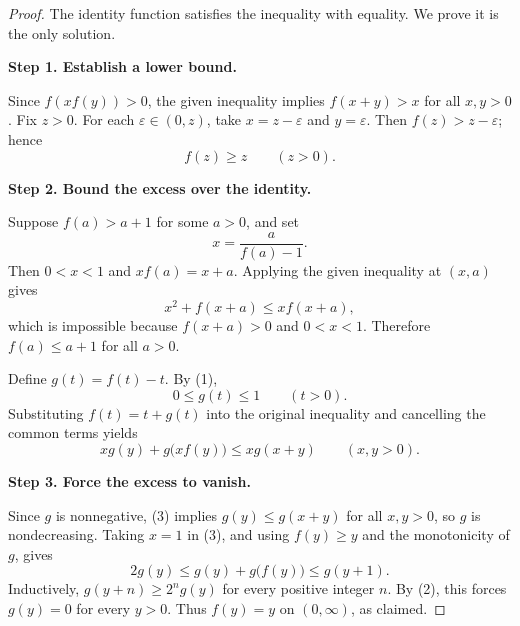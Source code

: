 
\begin{dlsummary}[title={\bfseries Solution 20. The Cross-Dilated Shift},breakable]

\begin{proof}
The identity function satisfies the inequality with equality. We prove it
is the only solution.

\medskip
\noindent
\textbf{Step 1. Establish a lower bound.}

Since $f(xf(y))>0$, the given inequality implies $f(x+y)>x$ for all
$x,y>0$. Fix $z>0$. For each $\varepsilon\in(0,z)$, take
$x=z-\varepsilon$ and $y=\varepsilon$. Then $f(z)>z-\varepsilon$;
hence
\[
f(z)\geq z\qquad(z>0). \tag{1}
\]

\medskip
\noindent
\textbf{Step 2. Bound the excess over the identity.}

Suppose $f(a)>a+1$ for some $a>0$, and set
\[
x=\frac{a}{f(a)-1}.
\]
Then $0<x<1$ and $xf(a)=x+a$. Applying the given inequality at
$(x,a)$ gives
\[
x^2+f(x+a)\leq x f(x+a),
\]
which is impossible because $f(x+a)>0$ and $0<x<1$. Therefore
$f(a)\leq a+1$ for all $a>0$.

Define $g(t)=f(t)-t$. By (1),
\[
0\leq g(t)\leq1\qquad(t>0). \tag{2}
\]
Substituting $f(t)=t+g(t)$ into the original inequality and cancelling
the common terms yields
\[
xg(y)+g\bigl(xf(y)\bigr)\leq xg(x+y)
\qquad(x,y>0). \tag{3}
\]

\medskip
\noindent
\textbf{Step 3. Force the excess to vanish.}

Since $g$ is nonnegative, (3) implies $g(y)\leq g(x+y)$ for all
$x,y>0$, so $g$ is nondecreasing. Taking $x=1$ in (3), and using
$f(y)\geq y$ and the monotonicity of $g$, gives
\[
2g(y)\leq g(y)+g\bigl(f(y)\bigr)\leq g(y+1).
\]
Inductively, $g(y+n)\geq2^n g(y)$ for every positive integer $n$.
By (2), this forces $g(y)=0$ for every $y>0$. Thus $f(y)=y$ on
$(0,\infty)$, as claimed.
\end{proof}

\end{dlsummary}